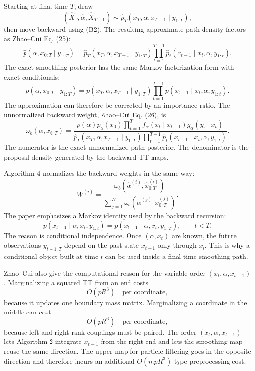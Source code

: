 \documentclass[11pt]{article}
\begin{document}
Starting at final time \(T\), draw
\[
    (\widehat X_T,\widehat\alpha,\widehat X_{T-1})
    \sim
    \widehat p_T(x_T,\alpha,x_{T-1}\mid y_{1:T}),
\]
then move backward using (B2).  The resulting approximate path density factors
as Zhao--Cui Eq. (25):
\[
    \widehat p(\alpha,x_{0:T}\mid y_{1:T})
    =
    \widehat p_T(x_T,\alpha,x_{T-1}\mid y_{1:T})
    \prod_{t=1}^{T-1}
    \widehat p_t(x_{t-1}\mid x_t,\alpha,y_{1:t}).
    \tag{B3}
\]
The exact smoothing posterior has the same Markov factorization form with exact
conditionals:
\[
    p(\alpha,x_{0:T}\mid y_{1:T})
    =
    p(x_T,\alpha,x_{T-1}\mid y_{1:T})
    \prod_{t=1}^{T-1}
    p(x_{t-1}\mid x_t,\alpha,y_{1:t}).
    \tag{B4}
\]
The approximation can therefore be corrected by an importance ratio.  The
unnormalized backward weight, Zhao--Cui Eq. (26), is
\[
    \omega_b(\alpha,x_{0:T})
    =
    \frac{
    p(\alpha)p_\alpha(x_0)
    \prod_{t=1}^{T}
    f_\alpha(x_t\mid x_{t-1})g_\alpha(y_t\mid x_t)}
    {
    \widehat p_T(x_T,\alpha,x_{T-1}\mid y_{1:T})
    \prod_{t=1}^{T-1}
    \widehat p_t(x_{t-1}\mid x_t,\alpha,y_{1:t})}.
    \tag{B5}
\]
The numerator is the exact unnormalized path posterior.  The denominator is the
proposal density generated by the backward TT maps.

Algorithm 4 normalizes the backward weights in the same way:
\[
    W^{(i)}
    =
    \frac{\omega_b(\widehat\alpha^{(i)},\widehat x_{0:T}^{(i)})}
    {\sum_{j=1}^{N}\omega_b(\widehat\alpha^{(j)},\widehat x_{0:T}^{(j)})}.
    \tag{B6}
\]
The paper emphasizes a Markov identity used by the backward recursion:
\[
    p(x_{t-1}\mid \alpha,x_t,y_{1:t})
    =
    p(x_{t-1}\mid \alpha,x_t,y_{1:T}),
    \qquad t<T.
    \tag{B7}
\]
The reason is conditional independence.  Once \((\alpha,x_t)\) are known, the
future observations \(y_{t+1:T}\) depend on the past state \(x_{t-1}\) only
through \(x_t\).  This is why a conditional object built at time \(t\) can be
used inside a final-time smoothing path.

Zhao--Cui also give the computational reason for the variable order
\((x_t,\alpha,x_{t-1})\).  Marginalizing a squared TT from an end costs
\[
    O(pR^3)\quad\text{per coordinate},
    \tag{B8}
\]
because it updates one boundary mass matrix.  Marginalizing a coordinate in the
middle can cost
\[
    O(pR^6)\quad\text{per coordinate},
    \tag{B9}
\]
because left and right rank couplings must be paired.  The order
\((x_t,\alpha,x_{t-1})\) lets Algorithm 2 integrate \(x_{t-1}\) from the right
end and lets the smoothing map reuse the same direction.  The upper map for
particle filtering goes in the opposite direction and therefore incurs an
additional \(O(mpR^3)\)-type preprocessing cost.
\end{document}
